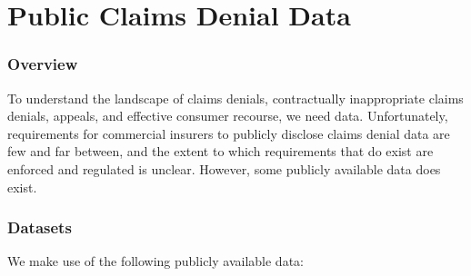 \documentclass[12pt, a4paper,twoside,parskip=full]{report}
\theoremstyle{plain} %
\theoremstyle{definition} %
\theoremstyle{remark} %
\numberwithin{equation}{chapter}
\begin{document}

		
		
		\chapter{Public Claims Denial Data}\label{publicdata}
				
		\subsection{Overview}\label{publicdata:overview}
		To understand the landscape of claims denials, contractually inappropriate claims denials,
		appeals, and effective consumer recourse, we need data. Unfortunately, requirements for commercial insurers to 
		publicly disclose claims denial
		data are few and far between, and the extent to which requirements that do
		exist are enforced and regulated is unclear. However, some publicly available data does exist.
		\subsection{Datasets}\label{publicdata:datasets}
		
		We make use of the following publicly available data:
		
\end{document}
